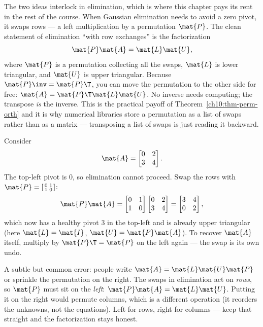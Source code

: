 The two ideas interlock in elimination, which is where this chapter pays its rent in the rest of the
course. When Gaussian elimination needs to avoid a zero pivot, it swaps rows --- a left multiplication
by a permutation $\mat{P}$. The clean statement of elimination ``with row exchanges'' is the
factorization
\[
  \mat{P}\mat{A} = \mat{L}\mat{U},
\]
where $\mat{P}$ is a permutation collecting all the swaps, $\mat{L}$ is lower triangular, and
$\mat{U}$ is upper triangular. Because $\mat{P}\inv=\mat{P}\T$, you can move the permutation to the
other side for free: $\mat{A}=\mat{P}\T\mat{L}\mat{U}$. No inverse needs computing; the transpose
\emph{is} the inverse. This is the practical payoff of Theorem~\ref{ch10:thm-perm-orth} and it is why
numerical libraries store a permutation as a list of swaps rather than as a matrix --- transposing a
list of swaps is just reading it backward.

\begin{example}\label{ch10:ex-pivot}
Consider
\[
  \mat{A}=\begin{bmatrix} 0 & 2 \\ 3 & 4 \end{bmatrix}.
\]
The top-left pivot is $0$, so elimination cannot proceed. Swap the rows with
$\mat{P}=\left[\begin{smallmatrix}0&1\\1&0\end{smallmatrix}\right]$:
\[
  \mat{P}\mat{A}
  = \begin{bmatrix} 0&1\\1&0 \end{bmatrix}\begin{bmatrix} 0 & 2 \\ 3 & 4 \end{bmatrix}
  = \begin{bmatrix} 3 & 4 \\ 0 & 2 \end{bmatrix},
\]
which now has a healthy pivot $3$ in the top-left and is already upper triangular (here $\mat{L}=\mat{I}$,
$\mat{U}=\mat{P}\mat{A}$). To recover $\mat{A}$ itself, multiply by $\mat{P}\T=\mat{P}$ on the left
again --- the swap is its own undo.
\end{example}

\begin{trapbox}
A subtle but common error: people write $\mat{A}=\mat{L}\mat{U}\mat{P}$ or sprinkle the permutation
on the right. The swaps in elimination act on \emph{rows}, so $\mat{P}$ must sit on the \emph{left}:
$\mat{P}\mat{A}=\mat{L}\mat{U}$. Putting it on the right would permute columns, which is a different
operation (it reorders the unknowns, not the equations). Left for rows, right for columns --- keep
that straight and the factorization stays honest.
\end{trapbox}


